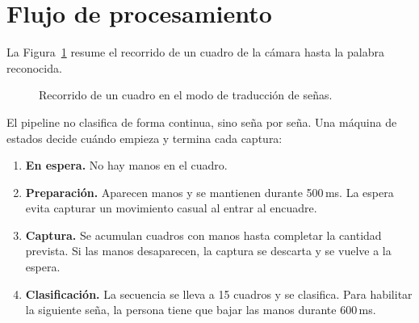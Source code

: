 \section{Flujo de procesamiento}
\label{sec:flujo}

La Figura~\ref{fig:flujo} resume el recorrido de un cuadro de la cámara hasta la palabra reconocida.

\begin{figure}[h]
    \centering
    \caption{Recorrido de un cuadro en el modo de traducción de señas.}
    \label{fig:flujo}
\end{figure}

El pipeline no clasifica de forma continua, sino seña por seña. Una máquina de estados decide cuándo empieza y termina cada captura:

\begin{enumerate}
    \item \textbf{En espera.} No hay manos en el cuadro.
    \item \textbf{Preparación.} Aparecen manos y se mantienen durante 500\,ms. La espera evita capturar un movimiento casual al entrar al encuadre.
    \item \textbf{Captura.} Se acumulan cuadros con manos hasta completar la cantidad prevista. Si las manos desaparecen, la captura se descarta y se vuelve a la espera.
    \item \textbf{Clasificación.} La secuencia se lleva a 15 cuadros y se clasifica. Para habilitar la siguiente seña, la persona tiene que bajar las manos durante 600\,ms.
\end{enumerate}

